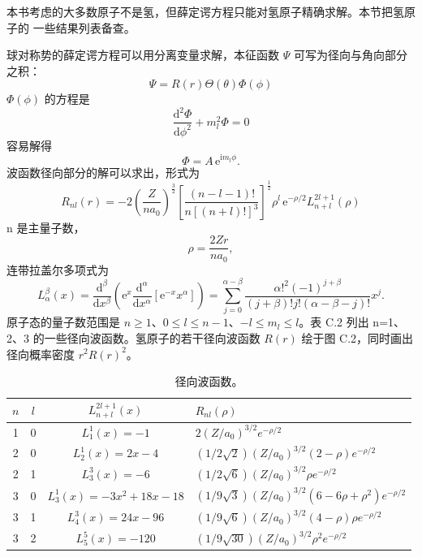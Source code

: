 本书考虑的大多数原子不是氢，但薛定谔方程只能对氢原子精确求解。本节把氢原子的
一些结果列表备查。

球对称势的薛定谔方程可以用分离变量求解，本征函数 $\Psi$ 可写为径向与角向部分
之积：
\begin{equation*}
\Psi = R(r)\Theta(\theta)\Phi(\phi)\tag{C.34}
\end{equation*}
$\Phi(\phi)$ 的方程是
\begin{equation*}
\frac{\mathrm{d}^{2}\Phi}{\mathrm{d}\phi^{2}} + m_l^{2}\Phi = 0\tag{C.35}
\end{equation*}
容易解得
\begin{equation*}
\Phi = A\,\mathrm{e}^{\mathrm{i}m_l\phi}.\tag{C.36}
\end{equation*}
波函数径向部分的解可以求出，形式为
\begin{equation*}
R_{nl}(r) = -2\left(\frac{Z}{na_0}\right)^{\frac{3}{2}}\left[\frac{(n-l-1)!}{n[(n+l)!]^{3}}\right]^{\frac{1}{2}}\rho^{l}\,\mathrm{e}^{-\rho/2}L_{n+l}^{2l+1}(\rho)\tag{C.37}
\end{equation*}
n 是主量子数，
\begin{equation*}
\rho = \frac{2Zr}{na_0},\tag{C.38}
\end{equation*}
连带拉盖尔多项式为
\begin{equation*}
L_{\alpha}^{\beta}(x) = \frac{\mathrm{d}^{\beta}}{\mathrm{d}x^{\beta}}\left(\mathrm{e}^{x}\frac{\mathrm{d}^{\alpha}}{\mathrm{d}x^{\alpha}}[\mathrm{e}^{-x}x^{\alpha}]\right) = \sum_{j=0}^{\alpha-\beta}\frac{\alpha!^{2}(-1)^{j+\beta}}{(j+\beta)!j!(\alpha-\beta-j)!}x^{j}.\tag{C.39}
\end{equation*}
原子态的量子数范围是 $n\geq1$、$0\leq l\leq n-1$、$-l\leq m_l\leq l$。表 C.2 列出
n=1、2、3 的一些径向波函数。氢原子的若干径向波函数 $R(r)$ 绘于图 C.2，同时画出
径向概率密度 $r^{2}R(r)^{2}$。

\begin{table}
\centering
\caption{径向波函数。}
\begin{small}
\begin{tabular}{cccl}
\toprule
$n$ & $l$ & $L_{n+l}^{2l+1}(x)$ & $R_{nl}(\rho)$\\
\midrule
1 & 0 & $L_1^1(x)=-1$ & $2(Z/a_0)^{3/2}e^{-\rho/2}$\\
2 & 0 & $L_2^1(x)=2x-4$ & $(1/2\sqrt{2})(Z/a_0)^{3/2}(2-\rho)e^{-\rho/2}$\\
2 & 1 & $L_3^3(x)=-6$ & $(1/2\sqrt{6})(Z/a_0)^{3/2}\rho e^{-\rho/2}$\\
3 & 0 & $L_3^1(x)=-3x^{2}+18x-18$ & $(1/9\sqrt{3})(Z/a_0)^{3/2}(6-6\rho+\rho^{2})e^{-\rho/2}$\\
3 & 1 & $L_4^3(x)=24x-96$ & $(1/9\sqrt{6})(Z/a_0)^{3/2}(4-\rho)\rho e^{-\rho/2}$\\
3 & 2 & $L_5^5(x)=-120$ & $(1/9\sqrt{30})(Z/a_0)^{3/2}\rho^{2}e^{-\rho/2}$\\
\bottomrule
\end{tabular}
\end{small}
\end{table}

